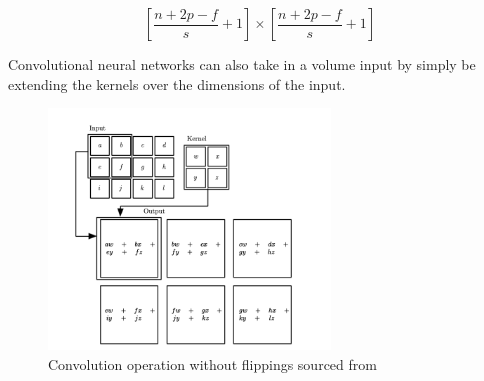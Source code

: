     
\[ \left[ \frac{n + 2p -f }{s} +1 \right]   \times  \left[ \frac{n + 2p -f }{s} +1 \right]
\]

Convolutional neural networks can also take in a volume input by simply be extending the kernels over the dimensions of the input.  


\begin{figure}
\centering
  \includegraphics[width=75mm,scale=0.75]{convolution.png}
  \caption{Convolution operation without flippings sourced from \citep{Goodfellow-et-al-2016}}
  \label{fig:convolution}
\end{figure}







